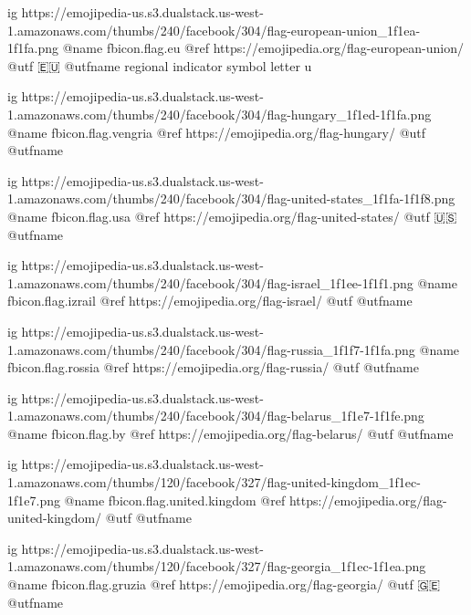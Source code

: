  
 
 
 
 

\ifcmt

  ig https://emojipedia-us.s3.dualstack.us-west-1.amazonaws.com/thumbs/240/facebook/304/flag-european-union_1f1ea-1f1fa.png
  @name fbicon.flag.eu
  @ref https://emojipedia.org/flag-european-union/
  @utf 🇪🇺
  @utfname regional indicator symbol letter u

  ig https://emojipedia-us.s3.dualstack.us-west-1.amazonaws.com/thumbs/240/facebook/304/flag-hungary_1f1ed-1f1fa.png
  @name fbicon.flag.vengria
  @ref https://emojipedia.org/flag-hungary/
  @utf
  @utfname

  ig https://emojipedia-us.s3.dualstack.us-west-1.amazonaws.com/thumbs/240/facebook/304/flag-united-states_1f1fa-1f1f8.png
  @name fbicon.flag.usa
  @ref https://emojipedia.org/flag-united-states/
  @utf 🇺🇸
  @utfname

  ig https://emojipedia-us.s3.dualstack.us-west-1.amazonaws.com/thumbs/240/facebook/304/flag-israel_1f1ee-1f1f1.png
  @name fbicon.flag.izrail
  @ref https://emojipedia.org/flag-israel/
  @utf
  @utfname

  ig https://emojipedia-us.s3.dualstack.us-west-1.amazonaws.com/thumbs/240/facebook/304/flag-russia_1f1f7-1f1fa.png
  @name fbicon.flag.rossia
  @ref https://emojipedia.org/flag-russia/
  @utf 
  @utfname

  ig https://emojipedia-us.s3.dualstack.us-west-1.amazonaws.com/thumbs/240/facebook/304/flag-belarus_1f1e7-1f1fe.png
  @name fbicon.flag.by
  @ref https://emojipedia.org/flag-belarus/
  @utf
  @utfname

	ig https://emojipedia-us.s3.dualstack.us-west-1.amazonaws.com/thumbs/120/facebook/327/flag-united-kingdom_1f1ec-1f1e7.png
	@name fbicon.flag.united.kingdom
	@ref https://emojipedia.org/flag-united-kingdom/
	@utf
	@utfname

	ig https://emojipedia-us.s3.dualstack.us-west-1.amazonaws.com/thumbs/120/facebook/327/flag-georgia_1f1ec-1f1ea.png
	@name fbicon.flag.gruzia
	@ref https://emojipedia.org/flag-georgia/
	@utf 🇬🇪
	@utfname
	
\fi
